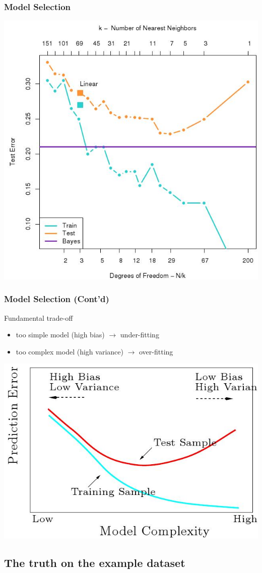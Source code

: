 \documentclass[compress, smaller, serif, 9pt]{beamer}
\begin{document}
\begin{frame}
  \frametitle{Model Selection}
  \begin{center}
    \includegraphics[width=.6\textwidth]{ex_selection_kpp_mc.jpg}
  \end{center}
\end{frame}


\begin{frame}
  \frametitle{Model Selection (Cont'd)}
  \begin{block}{Fundamental trade-off}
  \begin{itemize}
     \item too simple model (high bias) $\rightarrow$ \alert{under-fitting}
     \item too complex model (high variance) $\rightarrow$ \alert{over-fitting}
  \end{itemize}
  \end{block}
  \begin{center}
    \includegraphics[width=.6\textwidth]{compromis.jpg}
  \end{center}
\end{frame}


\subsection{The truth on the example dataset}
\end{document}
